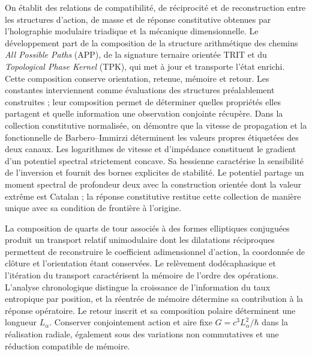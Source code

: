 \begingroup\fontsize{9.5}{10.7}\selectfont\setlength{\parskip}{1.5pt}\renewenvironment{abstract}{\begin{center}\bfseries\abstractname\end{center}\noindent}{\par}\begin{abstract}
On établit des relations de compatibilité, de réciprocité et de reconstruction
entre les structures d’action, de masse et de réponse constitutive obtenues
par l’holographie modulaire triadique et la mécanique dimensionnelle. Le développement
part de la composition de la structure arithmétique des chemins
\emph{All Possible Paths} (APP), de la signature ternaire orientée TRIT et du
\emph{Topological Phase Kernel} (TPK), qui met à jour et transporte l’état
enrichi. Cette composition conserve orientation, retenue, mémoire et
retour. Les constantes interviennent comme évaluations des
structures préalablement construites ; leur composition permet de déterminer quelles
propriétés elles partagent et quelle information une observation conjointe récupère.
Dans la collection constitutive normalisée, on démontre que la vitesse de
propagation et la fonctionnelle de Barbero--Immirzi déterminent les valeurs propres
étiquetées des deux canaux. Les logarithmes de vitesse et d’impédance
constituent le gradient d’un potentiel spectral strictement concave.
Sa hessienne caractérise la sensibilité de l’inversion et fournit des bornes
explicites de stabilité. Le potentiel partage un moment spectral de
profondeur deux avec la construction orientée dont la valeur extrême est Catalan ;
la réponse constitutive restitue cette collection de manière unique avec sa
condition de frontière à l’origine.

La composition de quarts de tour associés à des formes elliptiques conjuguées
produit un transport relatif unimodulaire dont les dilatations réciproques
permettent de reconstruire le coefficient adimensionnel d’action, la
coordonnée de clôture et l’orientation étant conservées. Le relèvement dodécaphasique et
l’itération du transport caractérisent la mémoire de l’ordre des
opérations. L’analyse chronologique distingue la croissance de
l’information du taux entropique par position, et la réentrée de mémoire
détermine sa contribution à la réponse opératoire. Le retour inscrit et
sa composition polaire déterminent une longueur $L_\alpha$. Conserver
conjointement action et aire fixe $G=c^3L_\alpha^2/\hbar$ dans la réalisation
radiale, également sous des variations non commutatives et une réduction compatible
de mémoire.


\end{abstract}
